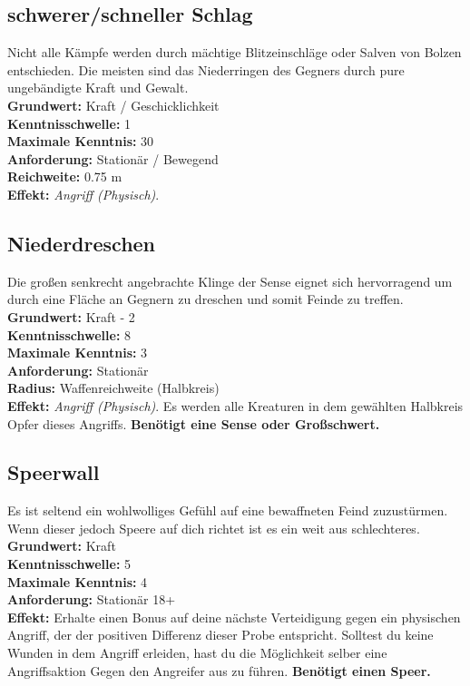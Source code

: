 \subsection*{schwerer/schneller Schlag} \label{sk:schlagen}
Nicht alle Kämpfe werden durch mächtige Blitzeinschläge oder Salven von Bolzen entschieden. Die meisten sind das Niederringen des Gegners durch pure ungebändigte Kraft und Gewalt.\\
\textbf{Grundwert:} Kraft / Geschicklichkeit\\
\textbf{Kenntnisschwelle:} 1 \\
\textbf{Maximale Kenntnis:} 30 \\
\textbf{Anforderung:} Stationär / Bewegend\\
\textbf{Reichweite:} 0.75 m \\
\textbf{Effekt:} \textit{Angriff (Physisch)}.

\subsection*{Niederdreschen} \label{sk:niederdreschen}
Die großen senkrecht angebrachte Klinge der Sense eignet sich hervorragend um durch eine Fläche an Gegnern zu dreschen und somit Feinde zu treffen. \\
\textbf{Grundwert:} Kraft - 2 \\
\textbf{Kenntnisschwelle:} 8 \\
\textbf{Maximale Kenntnis:} 3 \\
\textbf{Anforderung:} Stationär\\
\textbf{Radius:} Waffenreichweite (Halbkreis)\\
\textbf{Effekt:} \textit{Angriff (Physisch)}. Es werden alle Kreaturen in dem gewählten Halbkreis Opfer dieses Angriffs. \textbf{Benötigt eine Sense oder Großschwert.}

\subsection*{Speerwall} \label{sk:Speerwall}
Es ist seltend ein wohlwolliges Gefühl auf eine bewaffneten Feind zuzustürmen. Wenn dieser jedoch Speere auf dich richtet ist es ein weit aus schlechteres.\\
\textbf{Grundwert:} Kraft \\
\textbf{Kenntnisschwelle:} 5 \\
\textbf{Maximale Kenntnis:} 4 \\
\textbf{Anforderung:} Stationär 18+ \\
\textbf{Effekt:} Erhalte einen Bonus auf deine nächste Verteidigung gegen ein physischen Angriff, der der positiven Differenz dieser Probe entspricht. Solltest du keine Wunden in dem Angriff erleiden, hast du die Möglichkeit selber eine Angriffsaktion Gegen den Angreifer aus zu führen. \textbf{Benötigt einen Speer.}

